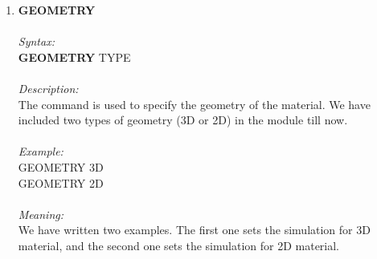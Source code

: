 \documentclass[12pt]{article}
\begin{document}
\begin{enumerate}
    

    \item \textbf{GEOMETRY}   \\ \\
    \textit{Syntax:} \\
    \textbf{GEOMETRY} TYPE \\ \\
    \textit{Description:} \\
    The command is used to specify the geometry of the material. We have included two types of geometry (3D or 2D) in the module till now. \\ \\
    \textit{Example:} \\
    GEOMETRY 3D \\
    GEOMETRY 2D \\ \\
    \textit{Meaning:} \\   
    We have written two examples. The first one sets the simulation for 3D material, and the second one sets the simulation for 2D material. \\ \\


\end{enumerate}
\end{document}
